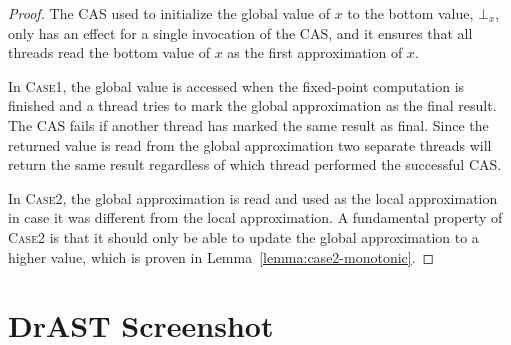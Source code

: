 {\begin{proof}
  The CAS used to initialize the global value of $x$ to the bottom value, $\bot_x$,
  only has an effect for a single invocation of the CAS, and it ensures that all threads
  read the bottom value of $x$ as the first approximation of $x$.

  In \textsc{Case1}, the global value is accessed when the fixed-point computation is finished and
  a thread
  tries to mark the global approximation as the final result. The CAS fails if another thread has
  marked the same result as final. Since the returned value is read from the global approximation
  two separate threads will return the same result regardless of which thread performed the
  successful CAS.

  In \textsc{Case2}, the global approximation is read and used as the local approximation in case it
  was different from the local approximation. A fundamental property of \textsc{Case2} is that
  it should only be able to update the global approximation to a higher value, which is proven
  in Lemma~\ref{lemma:case2-monotonic}.
\end{proof}

\newpage
\section{DrAST Screenshot}
\label{drast-screenshot}

}
